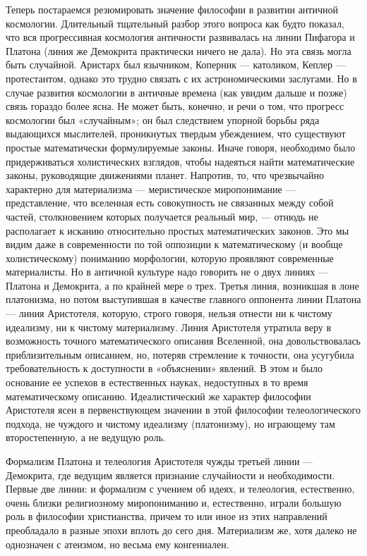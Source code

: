 Теперь постараемся резюмировать значение философии в развитии античной
космологии.  Длительный  тщательный  разбор этого  вопроса  как  будто
показал, что  вся прогрессивная  космология античности  развивалась на
линии Пифагора  и Платона  (линия же  Демокрита практически  ничего не
дала).  Но эта  связь могла  быть случайной.  Аристарх был  язычником,
Коперник  --- католиком,  Кеплер ---  протестантом, однако  это трудно
связать  с  их  астрономическими   заслугами.  Но  в  случае  развития
космологии  в  античные времена  (как  увидим  дальше и  позже)  связь
гораздо  более  ясна. Не  может  быть,  конечно,  и  речи о  том,  что
прогресс космологии был «случайным»;  он был следствием упорной борьбы
ряда  выдающихся  мыслителей,   проникнутых  твердым  убеждением,  что
существуют простые  математически формулируемые законы.  Иначе говоря,
необходимо было придерживаться холистических взглядов, чтобы надеяться
найти математические законы,  руководящие движениями планет. Напротив,
то,  что чрезвычайно  характерно  для  материализма ---  меристическое
миропонимание  ---  представление,  что  вселенная  есть  совокупность
не  связанных между  собой  частей,  столкновением которых  получается
реальный  мир,  ---  отнюдь  не  располагает  к  исканию  относительно
простых математических законов.  Это мы видим даже  в современности по
той оппозиции  к математическому  (и вообще  холистическому) пониманию
морфологии, которую проявляют современные  материалисты. Но в античной
культуре надо говорить не о двух  линиях --- Платона и Демокрита, а по
крайней мере  о трех.  Третья линия, возникшая  в лоне  платонизма, но
потом  выступившая в  качестве  главного оппонента  линии Платона  ---
линия Аристотеля, которую, строго говоря,  нельзя отнести ни к чистому
идеализму,  ни  к  чистому  материализму.  Линия  Аристотеля  утратила
веру  в возможность  точного математического  описания Вселенной,  она
довольствовалась приблизительным  описанием, но, потеряв  стремление к
точности, она усугубила требовательность  к доступности в «объяснении»
явлений. В  этом и  было основание ее  успехов в  естественных науках,
недоступных в  то время  математическому описанию.  Идеалистический же
характер философии  Аристотеля ясен  в первенствующем значении  в этой
философии  телеологического подхода,  не чуждого  и чистому  идеализму
(платонизму), но играющему там второстепенную, а не ведущую роль.

Формализм  Платона и  телеология  Аристотеля чужды  третьей линии  ---
Демокрита, где ведущим является признание случайности и необходимости.
Первые  две линии:  и  формализм  с учением  об  идеях, и  телеология,
естественно, очень  близки религиозному миропониманию  и, естественно,
играли большую  роль в философии  христианства, причем то или  иное из
этих  направлений  преобладало в  разные  эпохи  вплоть до  сего  дня.
Материализм же,  хотя далеко не  однозначен с атеизмом, но  весьма ему
конгениален.


